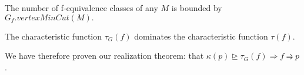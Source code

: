 
\begin{corrollary} The number of f-equivalence classes of any $M$ is bounded by $G_f.vertexMinCut(M).$
\label{lemma:eq-cl-approx}
\end{corrollary}

\begin{corrollary} The characteristic function $\tau_G(f)$ dominates the characteristic function $\tau(f)$.
\label{lemma:eq-cl-approx}
\end{corrollary}

We have therefore proven our realization theorem: that $\kappa(p)\trianglerighteq \tau_G(f) \Rightarrow f \rightrightharpoons p$.
